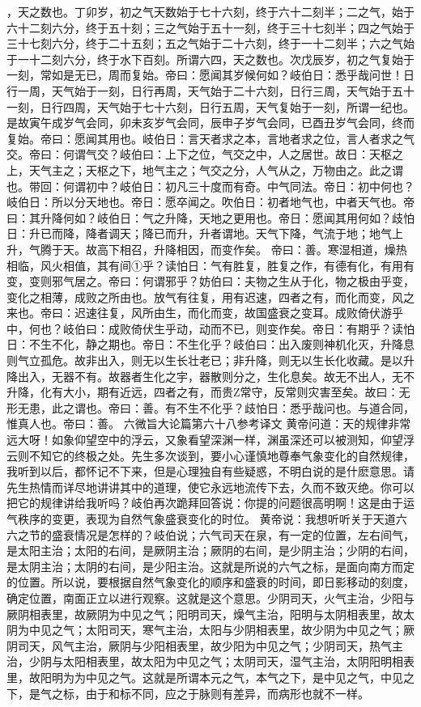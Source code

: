 \documentclass[a4paper,12pt,UTF8,twoside]{ctexbook}
\begin{document}
，天之数也。丁卯岁，初之气天数始于七十六刻，终于六十二刻半；二之气，始于六十二刻六分，终于五十刻；三之气始于五十一刻，终于三十七刻半；四之气始于三十七刻六分，终于二十五刻；五之气始于二十六刻，终于一十二刻半；六之气始于一十二刻六分，终于水下百刻。所谓六四，天之数也。次戊辰岁，初之气复始于一刻，常如是无已，周而复始。帝曰：愿闻其岁候何如？岐伯日：悉乎哉问世！日行一周，天气始于一刻，日行再周，天气始于二十六刻，日行三周，天气始于五十一刻，日行四周，天气始于七十六刻，日行五周，天气复始于一刻，所谓一纪也。是故寅午成岁气会同，卯未亥岁气会同，辰申子岁气会同，已酉丑岁气会同，终而复始。帝曰：愿闻其用也。岐伯日：言天者求之本，言地者求之位，言人者求之气交。帝曰：何谓气交？岐伯曰：上下之位，气交之中，人之居世。故日：天枢之上，天气主之；天枢之下，地气主之；气交之分，人气从之，万物由之。此之谓也。带回：何谓初中？岐伯日：初凡三十度而有奇。中气同法。帝日：初中何也？岐伯日：所以分天地也。帝日：愿卒闻之。吹伯日：初者地气也，中者天气也。帝曰：其升降何如？岐伯日：气之升降，天地之更用也。帝日：愿闻其用何如？歧怕日：升已而降，降者调天；降已而升，升者谓地。天气下降，气流于地；地气上升，气腾于天。故高下相召，升降相因，而变作矣。
帝曰：善。寒湿相道，燥热相临，风火相值，其有间①乎？读怕日：气有胜复，胜复之作，有德有化，有用有变，变则邪气居之。帝曰：何谓邪乎？妨伯曰：夫物之生从于化，物之极由乎变，变化之相薄，成败之所由也。放气有往复，用有迟速，四者之有，而化而变，风之来也。帝曰：迟速往复，风所由生，而化而变，故国盛衰之变耳。成败倚伏游乎中，何也？岐伯曰：成败倚伏生乎动，动而不已，则变作矣。帝日：有期乎？读怕日：不生不化，静之期也。帝日：不生化乎？岐伯曰：出入废则神机化灭，升降息则气立孤危。故非出入，则无以生长壮老已；非升降，则无以生长化收藏。是以升降出入，无器不有。故器者生化之宇，器散则分之，生化息矣。故无不出人，无不升降，化有大小，期有近远，四者之有，而贵Z常守，反常则灾害至矣。故曰：无形无患，此之谓也。帝曰：善。有不生不化乎？歧怕日：悉乎哉问也。与道合同，惟真人也。帝曰：善。
六微旨大论篇第六十八参考译文
黄帝问道：天的规律非常远大呀！如象仰望空中的浮云，又象看望深渊一样，渊虽深还可以被测知，仰望浮云则不知它的终极之处。先生多次谈到，要小心谨慎地尊奉气象变化的自然规律，我听到以后，都怀记不下来，但是心理独自有些疑惑，不明白说的是什麽意思。请先生热情而详尽地讲讲其中的道理，使它永远地流传下去，久而不致灭绝。你可以把它的规律讲给我听吗？岐伯再次跪拜回答说：你提的问题很高明啊！这是由于运气秩序的变更，表现为自然气象盛衰变化的时位。
黄帝说：我想听听关于天道六六之节的盛衰情况是怎样的？岐伯说；六气司天在泉，有一定的位置，左右间气，是太阳主治；太阳的右间，是厥阴主治；厥阴的右间，是少阴主治；少阴的右间，是太阴主治；太阴的右间，是少阳主治。这就是所说的六气之标，是面向南方而定的位置。所以说，要根据自然气象变化的顺序和盛衰的时间，即日影移动的刻度，确定位置，南面正立以进行观察。这就是这个意思。少阴司天，火气主治，少阳与厥阴相表里，故厥阴为中见之气；阳明司天，燥气主治，阳明与太阴相表里，故太阴为中见之气；太阳司天，寒气主治，太阳与少阴相表里，故少阴为中见之气；厥阴司天，风气主治，厥阴与少阳相表里，故少阳为中见之气；少阴司天，热气主治，少阴与太阳相表里，故太阳为中见之气；太阴司天，湿气主治，太阴阳明相表里，故阳明为为中见之气。这就是所谓本元之气，本气之下，是中见之气，中见之下，是气之标，由于和标不同，应之于脉则有差异，而病形也就不一样。
\end{document}
